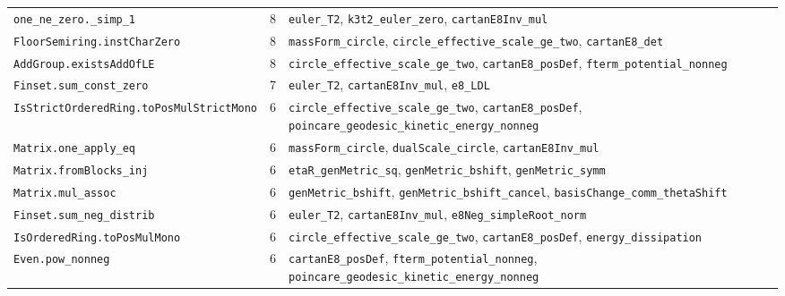 \begin{longtable}{p{}rp{}}
\texttt{\scriptsize one\_ne\_zero.\_simp\_1} & 8 & \texttt{\small euler\_T2}, \texttt{\small k3t2\_euler\_zero}, \texttt{\small cartanE8Inv\_mul} \\
\texttt{\scriptsize FloorSemiring.instCharZero} & 8 & \texttt{\small massForm\_circle}, \texttt{\small circle\_effective\_scale\_ge\_two}, \texttt{\small cartanE8\_det} \\
\texttt{\scriptsize AddGroup.existsAddOfLE} & 8 & \texttt{\small circle\_effective\_scale\_ge\_two}, \texttt{\small cartanE8\_posDef}, \texttt{\small fterm\_potential\_nonneg} \\
\texttt{\scriptsize Finset.sum\_const\_zero} & 7 & \texttt{\small euler\_T2}, \texttt{\small cartanE8Inv\_mul}, \texttt{\small e8\_LDL} \\
\texttt{\scriptsize IsStrictOrderedRing.toPosMulStrictMono} & 6 & \texttt{\small circle\_effective\_scale\_ge\_two}, \texttt{\small cartanE8\_posDef}, \texttt{\small poincare\_geodesic\_kinetic\_energy\_nonneg} \\
\texttt{\scriptsize Matrix.one\_apply\_eq} & 6 & \texttt{\small massForm\_circle}, \texttt{\small dualScale\_circle}, \texttt{\small cartanE8Inv\_mul} \\
\texttt{\scriptsize Matrix.fromBlocks\_inj} & 6 & \texttt{\small etaR\_genMetric\_sq}, \texttt{\small genMetric\_bshift}, \texttt{\small genMetric\_symm} \\
\texttt{\scriptsize Matrix.mul\_assoc} & 6 & \texttt{\small genMetric\_bshift}, \texttt{\small genMetric\_bshift\_cancel}, \texttt{\small basisChange\_comm\_thetaShift} \\
\texttt{\scriptsize Finset.sum\_neg\_distrib} & 6 & \texttt{\small euler\_T2}, \texttt{\small cartanE8Inv\_mul}, \texttt{\small e8Neg\_simpleRoot\_norm} \\
\texttt{\scriptsize IsOrderedRing.toPosMulMono} & 6 & \texttt{\small circle\_effective\_scale\_ge\_two}, \texttt{\small cartanE8\_posDef}, \texttt{\small energy\_dissipation} \\
\texttt{\scriptsize Even.pow\_nonneg} & 6 & \texttt{\small cartanE8\_posDef}, \texttt{\small fterm\_potential\_nonneg}, \texttt{\small poincare\_geodesic\_kinetic\_energy\_nonneg} \\
\end{longtable}

